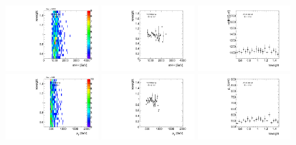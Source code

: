 \begin{figure}[htbp!]
\begin{center}
\includegraphics[width=0.32\textwidth,angle=-90]{figures/boosted/AppendixReweight/Weights/4Trk_Signal_mHH_l_weight.pdf}
\includegraphics[width=0.32\textwidth,angle=-90]{figures/boosted/AppendixReweight/Weights/4Trk_Signal_mHH_l_weight_profx.pdf}
\includegraphics[width=0.32\textwidth,angle=-90]{figures/boosted/AppendixReweight/Weights/4Trk_Signal_mHH_l_weight_profy.pdf}\\
\includegraphics[width=0.32\textwidth,angle=-90]{figures/boosted/AppendixReweight/Weights/4Trk_Signal_leadHCand_Pt_m_weight.pdf}
\includegraphics[width=0.32\textwidth,angle=-90]{figures/boosted/AppendixReweight/Weights/4Trk_Signal_leadHCand_Pt_m_weight_profx.pdf}
\includegraphics[width=0.32\textwidth,angle=-90]{figures/boosted/AppendixReweight/Weights/4Trk_Signal_leadHCand_Pt_m_weight_profy.pdf}\\

\end{center}
\end{figure}
